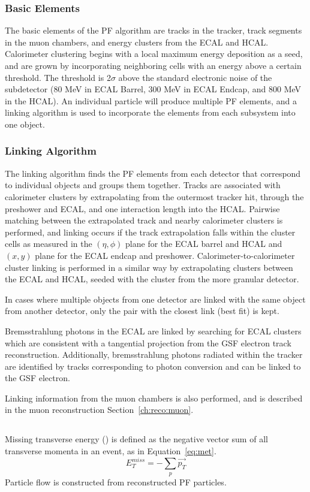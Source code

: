\subsubsection{Basic Elements}
The basic elements of the PF algorithm are tracks in the tracker, track segments in the muon chambers, and energy clusters from the ECAL and HCAL. 
Calorimeter clustering begins with a local maximum energy deposition as a seed, and are grown by incorporating neighboring cells with an energy above a certain threshold. The threshold is 2$\sigma$ above the standard electronic noise of the subdetector (80 MeV in ECAL Barrel, 300 MeV in ECAL Endcap, and 800 MeV in the HCAL). 
An individual particle will produce multiple PF elements, and a linking algorithm is used to incorporate the elements from each subsystem into one object. 

\subsubsection{Linking Algorithm}
The linking algorithm finds the PF elements from each detector that correspond to individual objects and groups them together. Tracks are associated with calorimeter clusters by extrapolating from the outermost tracker hit, through the preshower and ECAL, and one interaction length into the HCAL. Pairwise matching between the extrapolated track and nearby calorimeter clusters is performed, and linking occurs if the track extrapolation falls within the cluster cells as measured in the $(\eta,\phi)$ plane for the ECAL barrel and HCAL and $(x,y)$ plane for the ECAL endcap and preshower. Calorimeter-to-calorimeter cluster linking is performed in a similar way by extrapolating clusters between the ECAL and HCAL, seeded with the cluster from the more granular detector. 

In cases where multiple objects from one detector are linked with the same object from another detector, only the pair with the closest link (best fit) is kept. 

Bremsstrahlung photons in the ECAL are linked by searching for ECAL clusters which are consistent with a tangential projection from the GSF electron track reconstruction. Additionally, bremsstrahlung photons radiated within the tracker are identified by tracks corresponding to photon conversion and can be linked to the GSF electron. 

Linking information from the muon chambers is also performed, and is described in the muon reconstruction Section~\ref{ch:reco:muon}.


\subsection{\met}
Missing transverse energy (\met) is defined as the negative vector sum of all transverse momenta in an event, as in Equation~\ref{eq:met}.
\begin{equation}
    E_T^{miss}=-\sum_{p} \vec{p_T}
    \label{eq:met}
\end{equation}
Particle flow \met is constructed from reconstructed PF particles.
